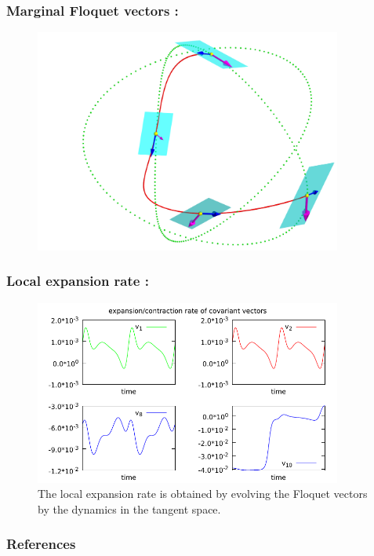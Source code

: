 \documentclass[mathserif, handout]{beamer}
\begin{document}
\begin{frame}
  \frametitle{Marginal Floquet vectors : }
    \begin{figure}[h]
    \centering
    \includegraphics[width=0.9\textwidth]{rpo1_marginal3}
  \end{figure}
\end{frame}

\begin{frame}
  \frametitle{Local expansion rate : }
  \begin{figure}[h]
    \centering
    \includegraphics[width=0.9\textwidth]{ppo1rate}
    \caption{The local expansion rate is obtained by evolving the Floquet vectors
    by the dynamics in the tangent space.}
  \end{figure}
\end{frame}

\begin{frame}[allowframebreaks] 
  \frametitle{References}
  \scriptsize{}
   
\end{frame}
\end{document}
